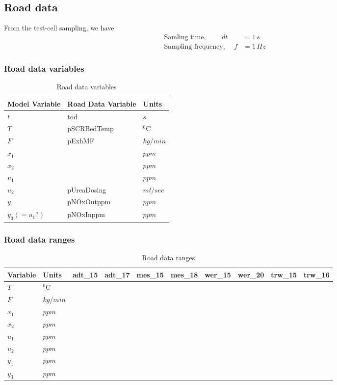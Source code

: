 \subsection{Road data}
From the test-cell sampling, we have
\begin{align*}
    \text{Samling time, } \qquad dt &= 1 \, s\\
    \text{Sampling frequency, } \quad f &= 1 \, Hz
\end{align*}



\subsubsection{Road data variables}
\begin{table}[H]
\centering
\begin{tabular}{l l l }
\hline \hline
Model Variable & Road Data Variable &Units\\
\hline \hline
$t$   & tod & $s$
\\
$T$   & pSCRBedTemp & $^0$C
\\
$F$   & pExhMF & $kg/min$
\\
$x_1$ & & $ppm$
\\
$x_2$ & & $ppm$
\\
$u_1$ & & $ppm$
\\
$u_2$ & pUreaDosing & $ml/sec$
\\
$y_1 $ & pNOxOutppm & $ppm$
\\
$y_3 (=u_1?)$ & pNOxInppm & $ppm$
\\
\hline
\end{tabular}
\caption{Road data variables}
\end{table}


\subsubsection{Road data ranges}
\begin{table}[H]
\centering
\begin{tabular}{l l l l l l l l l l }
\hline \hline
Variable & Units & adt\_15 &adt\_17&mes\_15&mes\_18&wer\_15&wer\_20&trw\_15&trw\_16
\\
\hline \hline
$T$   & $^0$C & & & &&&&&
\\
$F$   & $kg/min$ & & & &&&&&
\\
$x_1$ & $ppm$ & & & &&&&&
\\
$x_2$ & $ppm$ & & & &&&&&
\\
$u_1$ & $ppm$ & & & &&&&&
\\
$u_2$ & $ppm$ & & & &&&&&
\\
$y_1$ & $ppm$ & & & &&&&&
\\
$y_3$ & $ppm$ & & & &&&&&
\\
\hline \hline
\end{tabular}
\caption{Road data ranges}
\end{table}
